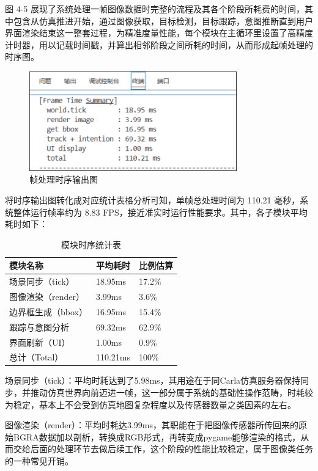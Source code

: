 图 4-5 展现了系统处理一帧图像数据时完整的流程及其各个阶段所耗费的时间，其中包含从仿真推进开始，通过图像获取，目标检测，目标跟踪，意图推断直到用户界面渲染结束这一整套过程，为精准度量性能，每个模块在主循环里设置了高精度计时器，用以记载时间戳，并算出相邻阶段之间所耗的时间，从而形成起帧处理的时序图。

\begin{figure}[H]
    \centering
    \includegraphics[width=0.8\textwidth]{images/图11 帧处理时序输出图.pdf}  %
    \caption{帧处理时序输出图}
    \label{fig:example_image}  %
\end{figure}

将时序输出图转化成对应统计表格分析可知，单帧总处理时间为 110.21 毫秒，系统整体运行帧率约为 8.83 FPS，接近准实时运行性能要求。其中，各子模块平均耗时如下：

\begin{table}[htbp]
  \caption{模块时序统计表}
  \label{tab:timetable}
  \centering
  \begin{tabular}{lll}
    \toprule
    模块名称 & 平均耗时 & 比例估算 \\
    \midrule
    场景同步（tick） & 18.95ms & 17.2\% \\
    图像渲染（render） & 3.99ms & 3.6\% \\
    边界框生成（bbox） & 16.95ms & 15.4\% \\
    跟踪与意图分析 & 69.32ms & 62.9\% \\
    界面刷新（UI） & 1.00ms & 0.9\% \\
	总计（Total） & 110.21ms & 100\% \\
    \bottomrule
  \end{tabular}
\end{table}

场景同步（tick）：平均时耗达到了5.98ms，其用途在于同Carla仿真服务器保持同步，并推动仿真世界向前迈进一帧，这一部分属于系统的基础性操作范畴，时耗较为稳定，基本上不会受到仿真地图复杂程度以及传感器数量之类因素的左右。

图像渲染（render）：平均时耗达3.99ms，其职能在于把图像传感器所传回来的原始BGRA数据加以剖析，转换成RGB形式，再转变成pygame能够渲染的格式，从而交给后面的处理环节去做后续工作，这个阶段的性能比较稳定，属于图像类任务的一种常见开销。

